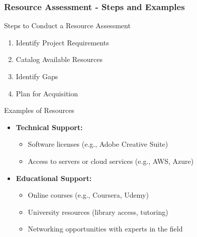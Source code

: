 \documentclass[aspectratio=169]{beamer}
\begin{document}
\begin{frame}[fragile]
    \frametitle{Resource Assessment - Steps and Examples}
    \begin{block}{Steps to Conduct a Resource Assessment}
        \begin{enumerate}
            \item Identify Project Requirements
            \item Catalog Available Resources
            \item Identify Gaps
            \item Plan for Acquisition
        \end{enumerate}
    \end{block}

    \begin{block}{Examples of Resources}
        \begin{itemize}
            \item \textbf{Technical Support:}
            \begin{itemize}
                \item Software licenses (e.g., Adobe Creative Suite)
                \item Access to servers or cloud services (e.g., AWS, Azure)
            \end{itemize}
            
            \item \textbf{Educational Support:}
            \begin{itemize}
                \item Online courses (e.g., Coursera, Udemy)
                \item University resources (library access, tutoring)
                \item Networking opportunities with experts in the field
            \end{itemize}
        \end{itemize}
    \end{block}
\end{frame}
\end{document}
